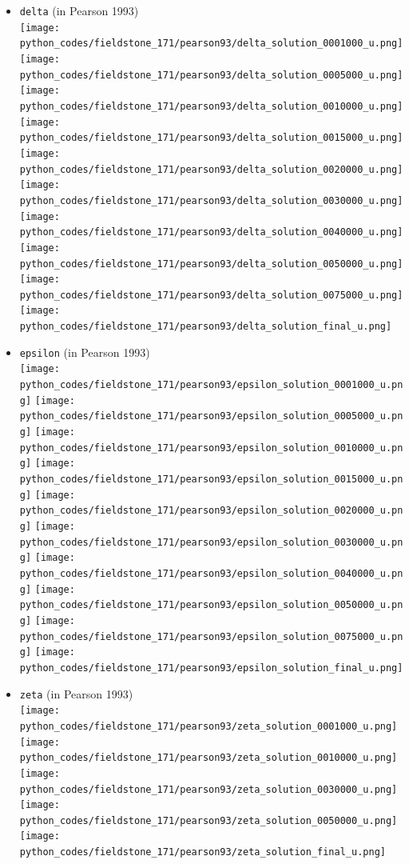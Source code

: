 \begin{itemize}
\item {\tt delta} (in Pearson 1993)\\
\texttt{[image: python\_codes/fieldstone\_171/pearson93/delta\_solution\_0001000\_u.png]}
\texttt{[image: python\_codes/fieldstone\_171/pearson93/delta\_solution\_0005000\_u.png]}
\texttt{[image: python\_codes/fieldstone\_171/pearson93/delta\_solution\_0010000\_u.png]}
\texttt{[image: python\_codes/fieldstone\_171/pearson93/delta\_solution\_0015000\_u.png]}
\texttt{[image: python\_codes/fieldstone\_171/pearson93/delta\_solution\_0020000\_u.png]}
\texttt{[image: python\_codes/fieldstone\_171/pearson93/delta\_solution\_0030000\_u.png]}
\texttt{[image: python\_codes/fieldstone\_171/pearson93/delta\_solution\_0040000\_u.png]}
\texttt{[image: python\_codes/fieldstone\_171/pearson93/delta\_solution\_0050000\_u.png]}
\texttt{[image: python\_codes/fieldstone\_171/pearson93/delta\_solution\_0075000\_u.png]}
\texttt{[image: python\_codes/fieldstone\_171/pearson93/delta\_solution\_final\_u.png]}

\item {\tt epsilon} (in Pearson 1993)\\
\texttt{[image: python\_codes/fieldstone\_171/pearson93/epsilon\_solution\_0001000\_u.png]}
\texttt{[image: python\_codes/fieldstone\_171/pearson93/epsilon\_solution\_0005000\_u.png]}
\texttt{[image: python\_codes/fieldstone\_171/pearson93/epsilon\_solution\_0010000\_u.png]}
\texttt{[image: python\_codes/fieldstone\_171/pearson93/epsilon\_solution\_0015000\_u.png]}
\texttt{[image: python\_codes/fieldstone\_171/pearson93/epsilon\_solution\_0020000\_u.png]}
\texttt{[image: python\_codes/fieldstone\_171/pearson93/epsilon\_solution\_0030000\_u.png]}
\texttt{[image: python\_codes/fieldstone\_171/pearson93/epsilon\_solution\_0040000\_u.png]}
\texttt{[image: python\_codes/fieldstone\_171/pearson93/epsilon\_solution\_0050000\_u.png]}
\texttt{[image: python\_codes/fieldstone\_171/pearson93/epsilon\_solution\_0075000\_u.png]}
\texttt{[image: python\_codes/fieldstone\_171/pearson93/epsilon\_solution\_final\_u.png]}

\item {\tt zeta} (in Pearson 1993)\\
\texttt{[image: python\_codes/fieldstone\_171/pearson93/zeta\_solution\_0001000\_u.png]}
\texttt{[image: python\_codes/fieldstone\_171/pearson93/zeta\_solution\_0010000\_u.png]}
\texttt{[image: python\_codes/fieldstone\_171/pearson93/zeta\_solution\_0030000\_u.png]}
\texttt{[image: python\_codes/fieldstone\_171/pearson93/zeta\_solution\_0050000\_u.png]}
\texttt{[image: python\_codes/fieldstone\_171/pearson93/zeta\_solution\_final\_u.png]}



\end{itemize}
